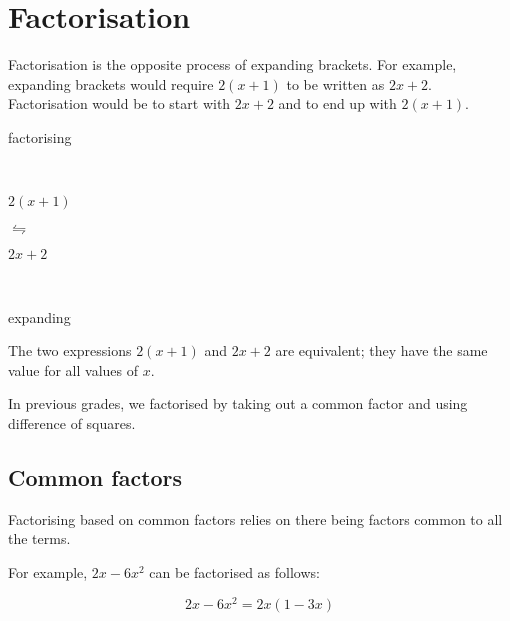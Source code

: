 \section{Factorisation}


Factorisation is the opposite process of expanding brackets. For example, expanding brackets would require $2(x+1)$ to be written as $2x+2$. Factorisation would be to start with $2x+2$ and to end up with $2(x+1)$. 

\Identity
{
\begin{center}
\begin{small}\hspace{8pt}factorising\end{small}\\
\begin{Large}
$2(x+1)$ \begin{Huge} $\leftrightharpoons$ \end{Huge} $2x+2$
\end{Large}\\
\begin{small}\hspace{8pt}expanding\end{small}
\end{center}
}

The two expressions $2(x+1)$ and $2x+2$ are equivalent; they have the same value for all values of $x$.


\par
In previous grades, we factorised by taking out a common factor and using difference of squares.\par 

\subsection*{Common factors}

Factorising based on common factors relies on there being factors common to all the terms. \par

For example, $2x-6{x}^{2}$ can be factorised as follows:\par 

\begin{equation*}
2x-6{x}^{2}=2x(1-3x)
\end{equation*}



